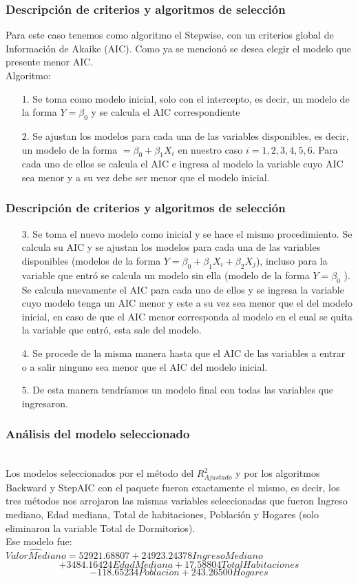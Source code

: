 \documentclass[12pt]{beamer}
\begin{document}
\begin{frame}
\frametitle{Descripción de criterios y algoritmos de selección}
Para este caso tenemos como algoritmo el Stepwise, con un criterios global de Información de Akaike (AIC). Como ya se mencionó se desea elegir el modelo que presente menor AIC.
~\\Algoritmo:
\begin{itemize}
\item[1.] Se toma como modelo inicial, solo con el intercepto, es decir, un modelo de la forma $Y=\beta_{0}$ y se calcula el AIC correspondiente
\item[2.] Se ajustan los modelos para cada una de las variables disponibles, es decir, un modelo de la forma $=\beta_{0}+\beta_{1}X_{i}$ en nuestro caso $i=1,2,3,4,5,6$. Para cada uno de ellos se calcula el AIC e ingresa al modelo la variable cuyo AIC sea menor y a su vez debe ser menor que el modelo inicial.
\end{itemize}
\end{frame}

\begin{frame}
\frametitle{Descripción de criterios y algoritmos de selección}
\begin{itemize}
\item[3.] Se toma el nuevo modelo como inicial y se hace el mismo procedimiento. Se calcula su AIC y se ajustan los modelos para cada una de las variables disponibles (modelos de la forma $Y=\beta_{0}+\beta_{1}X_{i}+\beta_{2}X_{j}$), incluso para la variable que entró se calcula un modelo sin ella (modelo de la forma $Y=\beta_{0}$ ). Se calcula nuevamente el AIC para cada uno de ellos y se ingresa la variable cuyo modelo tenga un AIC menor y este a su vez sea menor que el del modelo inicial, en caso de que el AIC menor corresponda al modelo en el cual se quita la variable que entró, esta sale del modelo.
\item[4.] Se procede de la misma manera hasta que el AIC de las variables a entrar o a salir ninguno sea menor que el AIC del modelo inicial.
\item[5.] De esta manera tendríamos un modelo final con todas las variables que ingresaron.
\end{itemize}
\end{frame}

\begin{frame}
\frametitle{Análisis del modelo seleccionado}
~\\ Los modelos seleccionados por el método del $R^2_{Ajustado}$ y por los algoritmos Backward y StepAIC con el paquete fueron exactamente el mismo, es decir, los tres métodos nos arrojaron las mismas variables seleccionadas que fueron Ingreso mediano, Edad mediana, Total de habitaciones, Población y Hogares (solo eliminaron la variable Total de Dormitorios).
~\\Ese modelo fue:
~\\$\hat{ValorMediano}=52921.68807+24923.24378 IngresoMediano$
$$+ 3484.16424 EdadMediana+17.58804 TotalHabitaciones$$
$$-118.65234 Poblacion +243.26500 Hogares$$
\end{frame}
\end{document}
